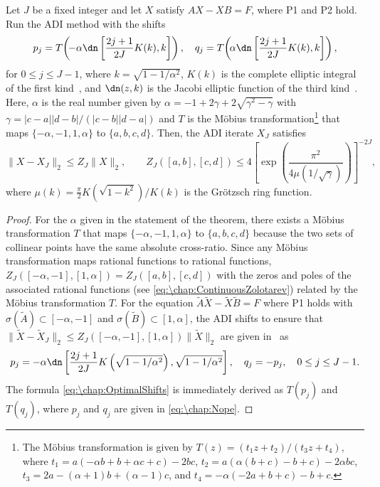 \begin{theorem}
Let $J$ be a fixed integer and let $X$ satisfy $AX-XB=F$, where P1 and P2 hold. Run the ADI method with the shifts
\begin{equation}
p_j = T\!\left(\! -\alpha \dn \left[ \frac{2j+1}{2J}K(k), k\right] \right), \quad q_j = T\!\left(\! \alpha \dn \left[ \frac{2j+1}{2J}K(k), k \right] \right),
\label{eq:\chap:OptimalShifts}
\end{equation}
for $0\leq j\leq J-1$, where $k = \sqrt{1-1/\alpha^2}$, $K(k)$ is the complete elliptic integral of the first kind~\cite[(19.2.8)]{NISTHandbook}, and $\dn(z,k)$ is the Jacobi elliptic function of the third kind~\cite[(22.2.6)]{NISTHandbook}.  Here, $\alpha$ is the real number given by $\alpha = -1+2\gamma + 2\sqrt{\gamma^2-\gamma}$ with $\gamma = |c-a||d-b|/(|c-b||d-a|)$ and $T$ is the M\"{o}bius transformation\footnote{The M\"{o}bius transformation is given by $T(z) = (t_1 z+t_2)/(t_3 z+t_4)$, where $t_1 = a (-\alpha  b+b+\alpha  c+c)-2 b c$, $t_2 = a (\alpha  (b+c)-b+c)-2 \alpha  b c$, $t_3 = 2 a-(\alpha +1) b+(\alpha -1) c$, and $t_4 = -\alpha  (-2 a+b+c)-b+c$.} that maps $\{-\alpha,-1,1,\alpha\}$ to $\{a,b,c,d\}$.  Then, the ADI iterate $X_J$ satisfies
\begin{equation}
\|X-X_J\|_2\leq Z_J\|X\|_2,\qquad Z_J([a,b],[c,d]) \leq 4\left[\exp\left(\frac{\pi^2}{4\mu(1/\sqrt{\gamma})}\right)\right]^{-2J},
\label{eq:\chap:ZolotarevBound}
\end{equation}
where $\mu(k) = \tfrac{\pi}{2}K(\sqrt{1-k^2})/K(k)$ is the Gr\"{o}tzsch ring function.
\label{thm:ADIconvergence}
\end{theorem}
\begin{proof}
For the $\alpha$ given in the statement of the theorem, there exists a M\"{o}bius transformation $T$ that maps $\{-\alpha,-1,1,\alpha\}$ to $\{a,b,c,d\}$ because the two sets of collinear points have the same absolute cross-ratio. Since any
M\"{o}bius transformation maps rational functions to rational functions, $Z_J([-\alpha,-1],[1,\alpha])=Z_J([a,b],[c,d])$ with the zeros and poles of the associated rational functions (see \cref{eq:\chap:ContinuousZolotarev}) related
by the M\"{o}bius transformation $T$. For the equation $\tilde{A}\tilde{X} - \tilde{X}\tilde{B} = F$ where P1 holds with $\sigma(\tilde{A}) \subset [-\alpha, -1]$ and $\sigma(\tilde{B}) \subset [1, \alpha]$, the ADI shifts to ensure that $\|\tilde{X}-\tilde{X}_J\|_2\leq Z_J([-\alpha,-1],[1,\alpha])\|\tilde{X}\|_2$ are given in~\cite[(2.18)]{Lu_91_01} as
\begin{equation}
p_j = -\alpha \dn \left[ \frac{2j+1}{2J}K\left(\sqrt{1-1/\alpha^2}\right), \sqrt{1-1/\alpha^2}\right], \quad q_j = -p_j, \quad 0\leq j\leq J-1.
\label{eq:\chap:Nope}
\end{equation}
The formula \cref{eq:\chap:OptimalShifts} is immediately derived as $T(p_j)$ and $T(q_j)$, where $p_j$ and $q_j$ are given in \cref{eq:\chap:Nope}.
\end{proof}

